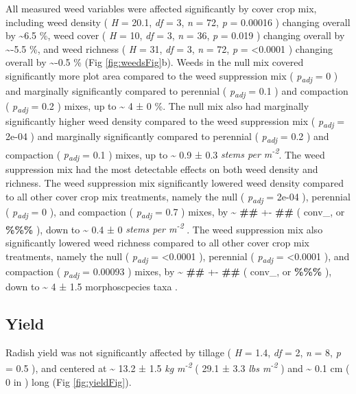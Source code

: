 \documentclass[
]{article}
\begin{document}
All measured weed variables were affected significantly by cover crop mix, including
weed density (
\emph{H} = 20.1,
\emph{df} = 3,
\emph{n} = 72,
\emph{p} = 0.00016
) changing overall by
\textasciitilde6.5 \%,
weed cover (
\emph{H} = 10,
\emph{df} = 3,
\emph{n} = 36,
\emph{p} = 0.019
) changing overall by
\textasciitilde-5.5 \%, and
weed richness (
\emph{H} = 31,
\emph{df} = 3,
\emph{n} = 72,
\emph{p} = \textless0.0001
) changing overall by
\textasciitilde-0.5 \%
(Fig \ref{fig:weedsFig}b).
Weeds in the null mix covered significantly more plot area compared to the weed suppression mix (
\emph{p\textsubscript{adj}} = 0
) and marginally significantly compared to perennial (
\emph{p\textsubscript{adj}} = 0.1
) and compaction (
\emph{p\textsubscript{adj}} = 0.2
) mixes,
up to
\textasciitilde{} 4 ±
0 \%.
The null mix also had marginally significantly higher weed density compared to the weed suppression mix (
\emph{p\textsubscript{adj}} = 2e-04
) and marginally significantly compared to perennial (
\emph{p\textsubscript{adj}} = 0.2
) and compaction (
\emph{p\textsubscript{adj}} = 0.1
) mixes,
up to
\textasciitilde{} 0.9 ±
0.3 \emph{stems per m\textsuperscript{-2}}.
The weed suppression mix had the most detectable effects on both weed density and richness.
The weed suppression mix significantly lowered weed density compared to all other cover crop mix treatments, namely the null (
\emph{p\textsubscript{adj}} = 2e-04
), perennial (
\emph{p\textsubscript{adj}} = 0
), and compaction (
\emph{p\textsubscript{adj}} = 0.7
) mixes, by
\textasciitilde{} \textbf{\#\#} +-
\textbf{\#\#} (
conv\_, or
\textbf{\%\%\%}
), down to
\textasciitilde{} 0.4 ±
0 \emph{stems per m\textsuperscript{-2}}
.
The weed suppression mix also significantly lowered weed richness compared to all other cover crop mix treatments, namely the null (
\emph{p\textsubscript{adj}} = \textless0.0001
), perennial (
\emph{p\textsubscript{adj}} = \textless0.0001
), and compaction (
\emph{p\textsubscript{adj}} = 0.00093
) mixes, by
\textasciitilde{} \textbf{\#\#} +-
\textbf{\#\#} (
conv\_, or
\textbf{\%\%\%}
), down to
\textasciitilde{} 4 ±
1.5 morphoscpecies taxa
.

\hypertarget{yield-1}{%
\subsection{Yield}\label{yield-1}}

Radish yield was not significantly affected by tillage (
\emph{H} = 1.4,
\emph{df} = 2,
\emph{n} = 8,
\emph{p} = 0.5
), and centered at
\textasciitilde{} 13.2 ±
1.5 \emph{kg m\textsuperscript{-2}}
(
29.1 ±
3.3 \emph{lbs m\textsuperscript{-2}}
) and
\textasciitilde{} 0.1 cm
(
0 in
)
long (Fig \ref{fig:yieldFig}).
\end{document}
